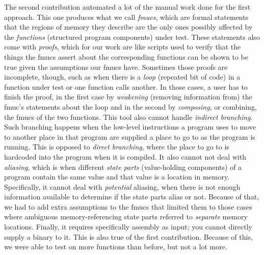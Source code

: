 {  The second contribution automated a lot of the manual work done for the first approach.
  This one produces what we call \emph{\acfp{fmuc}}, which are formal statements that the regions of memory they describe are the only ones possibly affected by the \emph{functions} (structured program components) under test.
  These statements also come with \emph{proofs}, which for our work are like scripts used to verify that the things the \acp{fmuc} assert about the corresponding functions can be shown to be true given the assumptions our \acp{fmuc} have.
  Sometimes those proofs are incomplete, though, such as when there is a \emph{loop} (repeated bit of code) in a function under test or one function calls another.
  In those cases, a user has to finish the proof, in the first case by \emph{weakening} (removing information from) the \ac{fmuc}'s statements about the loop and in the second by \emph{composing}, or combining, the \acp{fmuc} of the two functions.
  This tool also cannot handle \emph{indirect branching}.
  Such branching happens when the low-level instructions a program uses to move to another place in that program are supplied a place to go to as the program is running.
  This is opposed to \emph{direct branching}, where the place to go to is hardcoded into the program when it is compiled.
  It also cannot not deal with \emph{aliasing}, which is when different \emph{state parts} (value-holding components) of a program contain the same value and that value is a location in memory.
  Specifically, it cannot deal with \emph{potential} aliasing, when there is not enough information available to determine if the state parts alias or not.
  Because of that, we had to add extra assumptions to the \acp{fmuc} that limited them to those cases where ambiguous memory-referencing state parts referred to \emph{separate} memory locations.
  Finally, it requires specifically assembly as input; you cannot directly supply a binary to it.
  This is also true of the first contribution.
  Because of this, we were able to test on more functions than before, but not a lot more.

}
